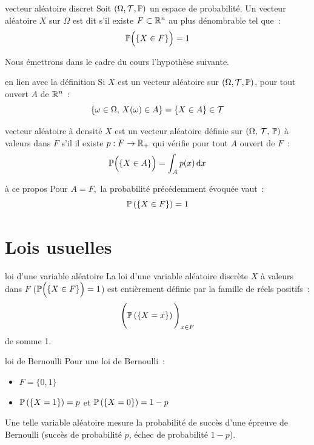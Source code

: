 \begin{definition}{}{vecteur aléatoire discret}
    Soit $(\Omega, \mathcal{T}, \mathbb{P})$ un espace de probabilité. Un vecteur aléatoire $X$ sur $\Omega$ est dit  s'il existe $F \subset \mathbb{R}^n$ au plus dénombrable tel que~:
    $$\mathbb{P}\Bigl(\{X \in F\}\Bigr) = 1$$
    
\end{definition}


Nous émettrons dans le cadre du cours l'hypothèse suivante.
\begin{remarque}{}{en lien avec la définition}
    Si $X$ est un vecteur aléatoire sur $(\Omega, \mathcal{T}, \mathbb{P})$, pour tout ouvert $A$ de $\mathbb{R}^n$~:
    $$\{\omega \in \Omega,\, X(\omega) \in A\} = \{X \in A\} \in \mathcal{T}$$
\end{remarque}

\begin{definition}{}{vecteur aléatoire à densité}
    $X$ est un vecteur aléatoire définie sur $(\Omega,\, \mathcal{T},\, \mathbb{P})$ à valeurs dans $F$ s'il il existe $p : F \to \mathbb{R}_+$ qui vérifie pour tout $A$ ouvert de $F$~:
    $$\mathbb{P}\Big(\{X \in A\}\Big) = \int_A p(x)\,\mathrm{d}x$$
\end{definition}

\begin{remarque}{}{à ce propos}
    Pour $A = F$,\, la probabilité précédemment évoquée vaut~:
    $$\mathbb{P}\left(\left\{X \in F\right\}\right) = 1$$
\end{remarque}
\section{Lois usuelles}

\begin{definition}{}{loi d'une variable aléatoire}
    La loi d'une variable aléatoire discrète $X$ à valeurs dans $F$ (\ie $\mathbb{P}\Big(\{X \in F\}\Big)=1$) est entièrement définie par la famille de réels positifs~:
    $$\Bigg(\mathbb{P}\left(\left\{X = x\right\}\right)\Bigg)_{x \in F}$$
    de somme 1.
\end{definition}

\begin{exemple}{}{loi de Bernoulli}
    Pour une loi de Bernoulli~:
    \begin{itemize}
        \item $\displaystyle F = \{0, 1\}$
        \item $\displaystyle \mathbb{P}\left(\left\{X = 1\right\}\right) = p$ et $\mathbb{P}\left(\left\{X = 0\right\}\right) = 1-p$
    \end{itemize}
    Une telle variable aléatoire mesure la probabilité de succès d'une épreuve de Bernoulli (succès de probabilité $p$, échec de probabilité $1-p$).
\end{exemple}

